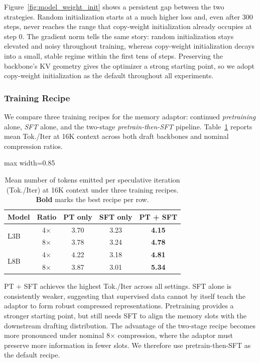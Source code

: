Figure~\ref{fig:model_weight_init} shows a persistent gap between the two strategies.
Random initialization starts at a much higher loss and, even after 300 steps, never reaches the range that copy-weight initialization already occupies at step 0.
The gradient norm tells the same story: random initialization stays elevated and noisy throughout training, whereas copy-weight initialization decays into a small, stable regime within the first tens of steps.
Preserving the backbone's KV geometry gives the optimizer a strong starting point, so we adopt copy-weight initialization as the default throughout all experiments.
\subsubsection{Training Recipe}

We compare three training recipes for the memory adaptor: continued \emph{pretraining} alone, \emph{SFT} alone, and the two-stage \emph{pretrain-then-SFT} pipeline.
Table~\ref{tab:training_procedure} reports mean Tok./Iter at 16K context across both draft backbones and nominal compression ratios.

\begin{table}[t]
    \centering
    \begin{adjustbox}{max width=0.85\linewidth}
    \begin{tabular}{@{}lcccc@{}}
        \toprule
        \textbf{Model} & \textbf{Ratio} & PT only & SFT only & PT + SFT \\
        \midrule
        \multirow{2}{*}{L3B}
            & 4$\times$ & 3.70 & 3.23 & \textbf{4.15} \\
            & 8$\times$ & 3.78 & 3.24 & \textbf{4.78} \\
        \midrule
        \multirow{2}{*}{L8B}
            & 4$\times$ & 4.22 & 3.18 & \textbf{4.81} \\
            & 8$\times$ & 3.87 & 3.01 & \textbf{5.34} \\
        \bottomrule
    \end{tabular}
    \end{adjustbox}
    \caption{Mean number of tokens emitted per speculative iteration (Tok./Iter) at 16K context under three training recipes. \textbf{Bold} marks the best recipe per row.}
    \label{tab:training_procedure}
\end{table}

PT + SFT achieves the highest Tok./Iter across all settings.
SFT alone is consistently weaker, suggesting that supervised data cannot by itself teach the adaptor to form robust compressed representations.
Pretraining provides a stronger starting point, but still needs SFT to align the memory slots with the downstream drafting distribution.
The advantage of the two-stage recipe becomes more pronounced under nominal 8$\times$ compression, where the adaptor must preserve more information in fewer slots.
We therefore use pretrain-then-SFT as the default recipe.

